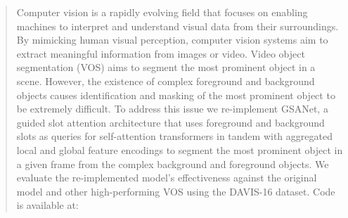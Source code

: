 \documentclass{article}
\theoremstyle{plain}
\theoremstyle{definition}
\theoremstyle{remark}
\begin{document}



\begin{abstract}
\vspace{10pt} 
Computer vision is a rapidly evolving field that focuses on enabling machines to interpret and understand visual data from their surroundings. By mimicking human visual perception, computer vision systems aim to extract meaningful information from images or video. Video object segmentation (VOS) aims to segment the most prominent object in a scene. However, the existence of complex foreground and background objects causes identification and masking of the most prominent object to be extremely difficult. To address this issue we re-implement GSANet, a guided slot attention architecture that uses foreground and background slots as queries for self-attention transformers in tandem with aggregated local and global feature encodings to segment the most prominent object in a given frame from the complex background and foreground objects. We evaluate the re-implemented model’s effectiveness against the original model and other high-performing VOS using the DAVIS-16 dataset. Code is available at:
\end{abstract}
\end{document}
